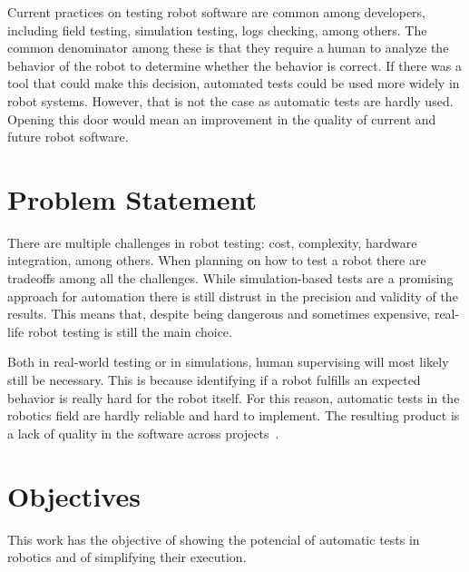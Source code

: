 \par

Current practices on testing robot software are common among developers, including field testing, simulation testing, logs checking, among others.
The common denominator among these is that they require a human to analyze the behavior of the robot to determine whether the behavior is correct. If there was a tool that could make this decision, automated tests could be used more widely in robot systems.
However, that is not the case as automatic tests are hardly used. Opening this door would mean an improvement 
in the quality of current and future robot software.


\section{Problem Statement}
\label{sec:problem}

There are multiple challenges in robot testing: cost, 
complexity, hardware integration, among others.
When planning on how to test a robot there are tradeoffs among all the challenges.
While simulation-based tests are a promising approach for automation 
there is still distrust in the precision and validity of the results.
This means that, despite being dangerous and sometimes expensive, real-life 
robot testing is still the main choice.

Both in real-world testing or in simulations, 
human supervising will most likely still be necessary.
This is because identifying if a robot fulfills an expected 
behavior is really hard for the robot itself.
For this reason, automatic tests in the robotics field are 
hardly reliable and hard to implement.
The resulting product is a lack of quality in the software 
across projects~\cite{TestRob}.


\section{Objectives}
\label{sec:objectives}

This work has the objective of showing the potencial of automatic 
tests in robotics and of simplifying their execution.


